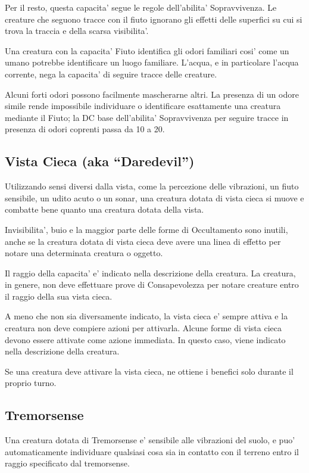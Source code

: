 \documentclass[a4paper,11pt,twoside,openany]{book}
\begin{document}
	Per il resto, questa capacita' segue le regole dell'abilita' Sopravvivenza. Le creature che seguono tracce con il fiuto ignorano gli effetti delle superfici su cui si trova la traccia e della scarsa visibilita'.
	
	Una creatura con la capacita' Fiuto identifica gli odori familiari cosi' come un umano potrebbe identificare un luogo familiare. L'acqua, e in particolare l'acqua corrente, nega la capacita' di seguire tracce delle creature.
	
	Alcuni forti odori possono facilmente mascherarne altri. La presenza di un odore simile rende impossibile individuare o identificare esattamente una creatura mediante il Fiuto; la DC base dell'abilita' Sopravvivenza per seguire tracce in presenza di odori coprenti passa da 10 a 20.
	
	
	\subsection{Vista Cieca (aka “Daredevil”)}
	
	Utilizzando sensi diversi dalla vista, come la percezione delle vibrazioni, un fiuto sensibile, un udito acuto o un sonar, una creatura dotata di vista cieca si muove e combatte bene quanto una creatura dotata della vista. 
	
	Invisibilita’, buio e la maggior parte delle forme di Occultamento sono inutili, anche se la creatura dotata di vista cieca deve avere una linea di effetto per notare una determinata creatura o oggetto. 
	
	Il raggio della capacita' e' indicato nella descrizione della creatura. La creatura, in genere, non deve effettuare prove di Consapevolezza per notare creature entro il raggio della sua vista cieca.
	
	A meno che non sia diversamente indicato, la vista cieca e' sempre attiva e la creatura non deve compiere azioni per attivarla. Alcune forme di vista cieca devono essere attivate come azione immediata. In questo caso, viene indicato nella descrizione della creatura.
	
	Se una creatura deve attivare la vista cieca, ne ottiene i benefici solo durante il proprio turno.
	
	\subsection{Tremorsense}
	Una creatura dotata di Tremorsense e' sensibile alle vibrazioni del suolo, e puo' automaticamente individuare qualsiasi cosa sia in contatto con il terreno entro il raggio specificato dal tremorsense.
	
\end{document}
